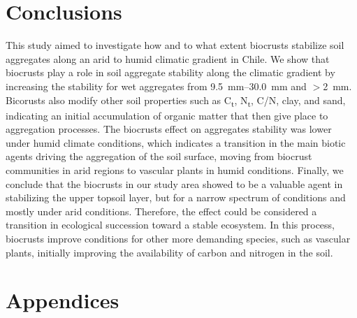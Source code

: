 {\section{Conclusions}

This study aimed to investigate how and to what extent biocrusts stabilize soil aggregates along an arid to humid climatic gradient in Chile. We show that biocrusts play a role in soil aggregate stability along the climatic gradient by increasing the stability for wet aggregates from \SIrange[range-units=single]{9.5}{30.0}{\milli\meter} and $>$\SI{2}{\milli\meter}. Bicorusts also modify other soil properties such as C\textsubscript{t}, N\textsubscript{t}, C/N, clay, and sand, indicating an initial accumulation of organic matter that then give place to aggregation processes. The biocrusts effect on aggregates stability was lower under humid climate conditions, which indicates a transition in the main biotic agents driving the aggregation of the soil surface, moving from biocrust communities in arid regions to vascular plants in humid conditions.
Finally, we conclude that the biocrusts in our study area showed to be a valuable agent in stabilizing the upper topsoil layer, but for a narrow spectrum of conditions and mostly under arid conditions. Therefore, the effect could be considered a transition in ecological succession toward a stable ecosystem. In this process, biocrusts improve conditions for other more demanding species, such as vascular plants, initially improving the availability of carbon and nitrogen in the soil.

\section*{Appendices}

}
